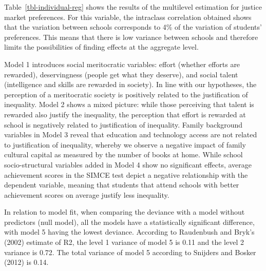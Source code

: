 \documentclass[
  letterpaper,
  DIV=11,
  numbers=noendperiod]{scrartcl}
\begin{document}
Table~\ref{tbl-individual-reg} shows the results of the multilevel
estimation for justice market preferences. For this variable, the
intraclass correlation obtained shows that the variation between schools
corresponds to 4\% of the variation of students' preferences. This means
that there is low variance between schools and therefore limits the
possibilities of finding effects at the aggregate level.

Model 1 introduces social meritocratic variables: effort (whether
efforts are rewarded), deservingness (people get what they deserve), and
social talent (intelligence and skills are rewarded in society). In line
with our hypotheses, the perception of a meritocratic society is
positively related to the justification of inequality. Model 2 shows a
mixed picture: while those perceiving that talent is rewarded also
justify the inequality, the perception that effort is rewarded at school
is negatively related to justification of inequality. Family background
variables in Model 3 reveal that education and technology access are not
related to justification of inequality, whereby we observe a negative
impact of family cultural capital as measured by the number of books at
home. While school socio-structural variables added in Model 4 show no
significant effects, average achievement scores in the SIMCE test depict
a negative relationship with the dependent variable, meaning that
students that attend schools with better achievement scores on average
justify less inequality.

In relation to model fit, when comparing the deviance with a model
without predictors (null model), all the models have a statistically
significant difference, with model 5 having the lowest deviance.
According to Raudenbush and Bryk's (2002) estimate of R2, the level 1
variance of model 5 is 0.11 and the level 2 variance is 0.72. The total
variance of model 5 according to Snijders and Bosker (2012) is 0.14.
\end{document}
